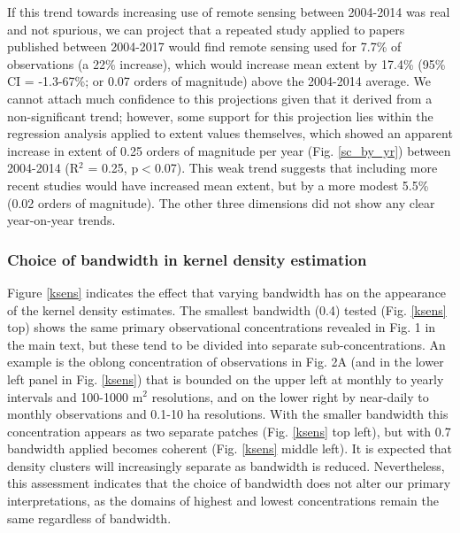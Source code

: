 \documentclass[12pt]{article}
\begin{document}
If this trend towards increasing use of remote sensing between 2004-2014 was real and not spurious, we can project that a repeated study applied to papers published between 2004-2017 would find remote sensing used for 7.7\% of observations (a 22\% increase), which would increase mean extent by 17.4\% (95\% CI = -1.3-67\%;  or 0.07 orders of magnitude) above the 2004-2014 average. We cannot attach much confidence to this projections given that it derived from a non-significant trend; however, some support for this projection lies within the regression analysis applied to extent values themselves, which showed an apparent increase in extent of 0.25 orders of magnitude per year (Fig. \ref{sc_by_yr}) between 2004-2014 (R$^2$ = 0.25, p$<$0.07). This weak trend suggests that including more recent studies would have increased mean extent, but by a more modest 5.5\% (0.02 orders of magnitude).  The other three dimensions did not show any clear year-on-year trends. 

\subsubsection*{Choice of bandwidth in kernel density estimation}
\vspace{-10pt}
Figure \ref{ksens} indicates the effect that varying bandwidth has on the appearance of the kernel density estimates. The smallest bandwidth (0.4) tested (Fig. \ref{ksens} top) shows the same primary observational concentrations revealed in Fig. 1 in the main text, but these tend to be divided into separate sub-concentrations. An example is the oblong concentration of observations in Fig. 2A (and in the lower left panel in Fig. \ref{ksens}) that is bounded on the upper left at monthly to yearly intervals and 100-1000 m$^2$ resolutions, and on the lower right by near-daily to monthly observations and 0.1-10 ha resolutions. With the smaller bandwidth this concentration appears as two separate patches (Fig. \ref{ksens} top left), but with 0.7 bandwidth applied becomes coherent (Fig. \ref{ksens} middle left). It is expected that density clusters will increasingly separate as bandwidth is reduced. Nevertheless, this assessment indicates that the choice of bandwidth does not alter our primary interpretations, as the domains of highest and lowest concentrations remain the same regardless of bandwidth.  
\end{document}
